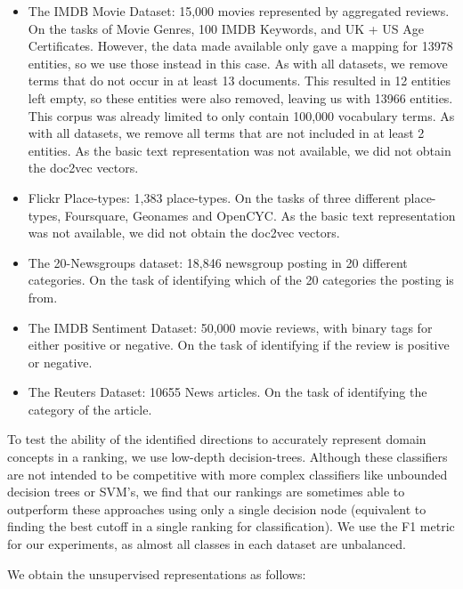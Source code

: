 \begin{itemize} %
	\item The IMDB Movie Dataset: 15,000 movies represented by aggregated reviews. On the tasks of Movie Genres, 100 IMDB Keywords, and UK + US Age Certificates. However, the data made available only gave a mapping for 13978 entities, so we use those instead in this case. As with all datasets, we remove terms that do not occur in at least 13 documents. This resulted in 12 entities left empty, so these entities were also removed, leaving us with 13966 entities. This corpus was already limited to only contain 100,000 vocabulary terms. As with all datasets, we remove all terms that are not included in at least 2 entities. As the basic text representation was not available, we did not obtain the doc2vec vectors.
	\item Flickr Place-types: 1,383 place-types. On the tasks of three different place-types, Foursquare, Geonames and OpenCYC. As the basic text representation was not available, we did not obtain the doc2vec vectors.
	\item The 20-Newsgroups dataset: 18,846 newsgroup posting in 20 different categories. On the task of identifying which of the 20 categories the posting is from.
	\item The IMDB Sentiment Dataset: 50,000 movie reviews, with binary tags for either positive or negative. On the task of identifying if the review is positive or negative.
	\item The Reuters Dataset: 10655 News articles. On the task of identifying the category of the article.
\end{itemize}
To test the ability of the identified directions to accurately represent domain concepts in a ranking, we use low-depth decision-trees. Although these classifiers are not intended to be competitive with more complex classifiers like unbounded decision trees or SVM's, we find that our rankings are sometimes able to outperform these approaches using only a single decision node (equivalent to finding the best cutoff in a single ranking for classification). We use the F1 metric for our experiments, as almost all classes in each dataset are unbalanced. 


We obtain the unsupervised representations as follows:

